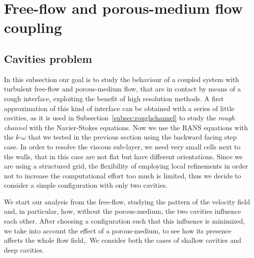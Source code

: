 \FloatBarrier
\section{Free-flow and porous-medium flow coupling}
\subsection{Cavities problem}
In this subsection our goal is to study the behaviour of a coupled system with turbulent free-flow and 
porous-medium flow, that are in contact by means of a rough interface, exploiting the benefit of high resolution methods. A first approximation of this kind of interface can be obtained with a series of little
cavities, as it is used in Subsection~\ref{subsec:roughchannel} to study the \emph{rough channel} with the 
Navier-Stokes equations. Now we use the RANS equations with the 
$k\text{-}\omega$ that we tested in the previous section using the backward 
facing step case.
%
In order to resolve the viscous sub-layer, we need very small cells next to the walls, that in this case are not flat but have different orientations. Since we are using a structured grid, the flexibility of employing local refinements in order not to increase the computational effort too much is limited, thus we decide to consider a simple configuration with only two cavities.

We start our analysis from the free-flow, studying the pattern of the velocity 
field and, in particular, how, without the porous-medium, the two cavities 
influence each other.
After choosing a configuration such that this influence is minimized, we take 
into account the effect of a porous-medium, to see how its presence affects the 
whole flow field,. We consider both the cases of shallow cavities and deep cavities.
%
